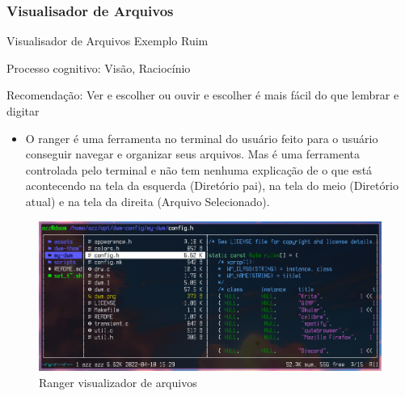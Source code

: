 \documentclass{beamer}
\begin{document}
\subsubsection{Visualisador de Arquivos}
\begin{frame}{Visualisador de Arquivos Exemplo Ruim}

Processo cognitivo: Visão, Raciocínio

Recomendação: Ver e escolher ou ouvir e escolher é mais fácil do que lembrar e digitar

\begin{itemize}
    \item O ranger é uma ferramenta no terminal do usuário feito para o usuário conseguir navegar e organizar seus arquivos. Mas é uma ferramenta controlada pelo terminal e não tem nenhuma explicação de o que está acontecendo na tela da esquerda (Diretório pai), na tela do meio (Diretório atual) e na tela da direita (Arquivo Selecionado).
\end{itemize}
\begin{figure}
    \centering
    \includegraphics[scale=0.2]{images/ranger.png}
    \caption{Ranger visualizador de arquivos}
\end{figure}

\end{frame}
\end{document}
